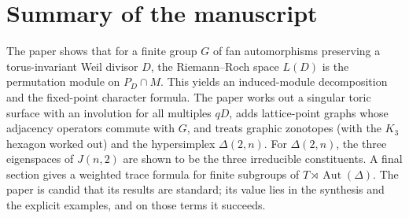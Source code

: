 \documentclass[12pt,letterpaper]{article}
\DeclareMathOperator{\Aut}{Aut}
\begin{document}
\section{Summary of the manuscript}
The paper shows that for a finite group $G$ of fan automorphisms preserving a torus-invariant Weil divisor $D$, the Riemann--Roch space $L(D)$ is the permutation module on $P_D\cap M$.  This yields an induced-module decomposition and the fixed-point character formula.  The paper works out a singular toric surface with an involution for all multiples $qD$, adds lattice-point graphs whose adjacency operators commute with $G$, and treats graphic zonotopes (with the $K_3$ hexagon worked out) and the hypersimplex $\Delta(2,n)$.  For $\Delta(2,n)$, the three eigenspaces of $J(n,2)$ are shown to be the three irreducible constituents.  A final section gives a weighted trace formula for finite subgroups of $T\rtimes\Aut(\Delta)$.  The paper is candid that its results are standard; its value lies in the synthesis and the explicit examples, and on those terms it succeeds.
\end{document}
